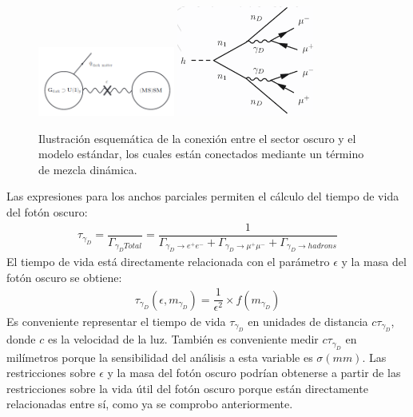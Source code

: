 \begin{figure}
    \centering
    \includegraphics[width=0.4\textwidth]{Fisica_de_Particulas/imagenes/sketch_darksector.png}
    \includegraphics[width=0.4\textwidth]{Fisica_de_Particulas/imagenes/darksusy_feynman.png}
    \caption{ Ilustración esquemática de la conexión entre el sector oscuro y el modelo estándar, los cuales están conectados mediante un término de mezcla dinámica.}
    \label{fig:sketch_darksector}
\end{figure}



Las expresiones para los anchos parciales permiten el cálculo del tiempo de vida del fotón oscuro:
\begin{eqnarray}
\label{an-15-455:ec6}
\tau_{\gamma_D} = \dfrac{}{\Gamma_{\gamma_D Total}} =\dfrac{1}{\Gamma_{\gamma_D \rightarrow e^+ e^-} + \Gamma_{\gamma_D \rightarrow \mu^+ \mu^-} + \Gamma_{\gamma_D \rightarrow hadrons }}
\end{eqnarray}
El tiempo de vida está directamente relacionada con el parámetro $\epsilon$ y la masa del fotón oscuro se obtiene:
\begin{eqnarray}
\label{an-15-455:ec7}
\tau_{\gamma_D}(\epsilon,m_{\gamma_D}) =\dfrac{1}{\epsilon^2}\times f(m_{\gamma_D})
\end{eqnarray}
Es conveniente representar el tiempo de vida $\tau_{\gamma_D}$ en unidades de distancia $c\tau_{\gamma_D}$, donde $c$ es la velocidad de la luz. También es conveniente medir $c\tau_{\gamma_D}$ en milímetros porque la sensibilidad del análisis a esta variable es $\sigma(mm)$. Las restricciones sobre $\epsilon$ y la masa del fotón oscuro podrían obtenerse a partir de las restricciones sobre la vida útil del fotón oscuro porque están directamente relacionadas entre sí, como ya se comprobo anteriormente.

